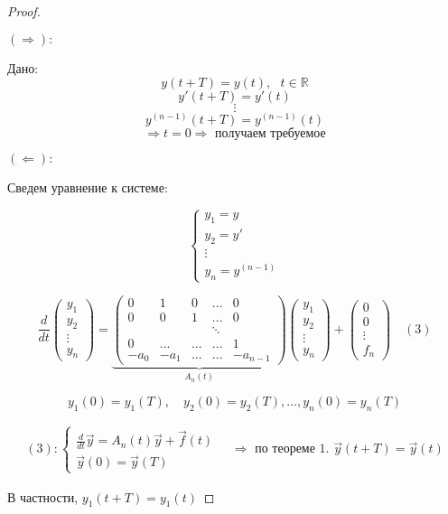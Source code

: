 \documentclass[12pt, a4paper]{report}
\begin{document}
\begin{proof} \(  \) 
\begin{flushleft}
    \( (\Rightarrow): \) 
\end{flushleft}

Дано:  
\[  y(t+T )= y(t ) , \text{ }  t \in \mathbb{R}  \] 
\[ y'(t+T ) = y' (t) \]  
\[ \vdots \] 
\[ y^{(n-1 )} (t+T ) = y^{(n-1 )}  (t) \] 
\[ \Rightarrow t =0 \Rightarrow \text{ получаем требуемое}  \] 

\begin{flushleft}
    \( (\Leftarrow): \) 
\end{flushleft}

Сведем уравнение к системе: 

\[ \begin{cases}
y_1 = y \\ 
y_2 = y' \\ 
\vdots \\ 
y_n = y^{(n-1)} 
\end{cases} \]

\[ \frac{d}{dt} \begin{pmatrix}
y_1 \\
y_2\\
\vdots\\
y_n
\end{pmatrix} = \underbrace{\begin{pmatrix}
    0 & 1 & 0 & ... & 0\\
    0 & 0 & 1 & ... & 0\\
    &  &  & \ddots & \\
    0 & ... & ... & ... & 1\\
    -a_0  & -a_1  & ... & ... & -a_{n-1} 
    \end{pmatrix}}_{A_n(t)}\begin{pmatrix}
    y_1 \\
    y_2\\
    \vdots\\
    y_n
\end{pmatrix} + \begin{pmatrix}
    0 \\
    0\\
    \vdots\\
    f_n
\end{pmatrix} \quad (3) \] 

\[ y_1 (0 )= y_1 (T  ) ,\quad  y_2 (0 ) =y_2 (T ) ,..., y_n (0 ) = y_n (T) \] 

\[ \begin{aligned}
    (3):\begin{cases}
        \displaystyle  \frac{d}{dt } \vec{y }  = A_n (t )\vec{y } + \vec{f } (t ) \\ 
        \vec{y } (0 ) = \vec{y } (T)
    \end{cases}
    \quad \Rightarrow \text{ по теореме 1. }  \vec{y } (t +T ) = \vec{y } (t )
\end{aligned} \] 

В частности, \( y_1 (t +T ) = y_1 (t ) \) 



\end{proof}
\end{document}
